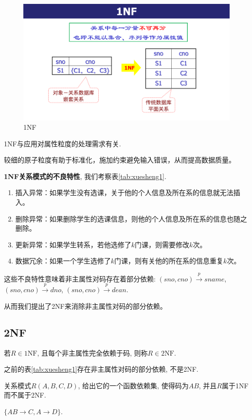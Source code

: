 \begin{figure}[H]
    \centering
    \includegraphics[width=.5\textwidth]{./figure/1NF.pdf}
    \caption{1NF}
\end{figure}

\begin{remark}
  1NF与应用对属性粒度的处理需求有关.

  较细的原子粒度有助于标准化，施加约束避免输入错误，从而提高数据质量。
\end{remark}

\textbf{1NF关系模式的不良特性}, 我们考察表\ref{tab:xuesheng1}.
\begin{enumerate}
    \item 插入异常：如果学生没有选课，关于他的个人信息及所在系的信息就无法插入。
    \item 删除异常：如果删除学生的选课信息，则他的个人信息及所在系的信息也随之删除。
    \item 更新异常：如果学生转系，若他选修了$k$门课，则需要修改$k$次。
    \item 数据冗余：如果一个学生选修了$k$门课，则有关他的所在系的信息重复$k$次。
\end{enumerate}
这些不良特性意味着非主属性对码存在着部分依赖: $(sno,cno)\overset{p}{\rightarrow} sname$, $(sno,cno)\overset{p}{\rightarrow} dno$, $(sno,cno)\overset{p}{\rightarrow} dean$.

从而我们提出了2NF来消除非主属性对码的部分依赖。

\subsection{2NF}

\begin{definition}[2NF]
  若$R\in 1\text{NF}$, 且每个非主属性完全依赖于码, 则称$R\in 2\text{NF}$.
\end{definition}

\begin{remark}
  之前的表\ref{tab:xuesheng1}存在非主属性对码的部分依赖, 不是2NF.
\end{remark}

\begin{example}
  关系模式$R(A,B,C,D)$, 给出它的一个函数依赖集, 使得码为$AB$, 并且$R$属于1NF而不属于2NF.

  $\{AB\to C, A\to D\}$.
\end{example}

